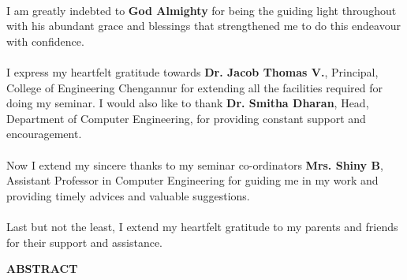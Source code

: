 \documentclass[a4paper,12pt,oneside]{article}
\begin{document}
\paragraph{}
I am greatly indebted to \textbf{God Almighty} for being the guiding light throughout with his
abundant grace and blessings that strengthened me to do this endeavour with confidence.
\paragraph{}
I express my heartfelt gratitude towards \textbf{Dr. Jacob Thomas V.}, Principal, College
of Engineering Chengannur for extending all the facilities required for doing my seminar.
I would also like to thank \textbf{Dr. Smitha Dharan}, Head, Department of Computer
Engineering, for providing constant support and encouragement.
\paragraph{}
Now I extend my sincere thanks to my seminar co-ordinators \textbf{Mrs. Shiny B}, Assistant
Professor in Computer Engineering for guiding me in my work and providing timely
advices and valuable suggestions.
\paragraph{}
Last but not the least, I extend my heartfelt gratitude to my parents and friends for
their support and assistance.	

\newpage
\begin{center}
\large{\textbf{ABSTRACT}}
\end{center}
\vspace{4ex}
\paragraph{}



\setlength{\baselineskip}{1.0\baselineskip}

\setlength{\baselineskip}{1.0\baselineskip}
\newpage
\begin{center}
\tableofcontents
\end{center}

\newpage
\thispagestyle{plain}
\begin{center}
\listoffigures
\end{center}

\newpage
\thispagestyle{plain}
\begin{center}
\listoftables
\end{center}
\end{document}
